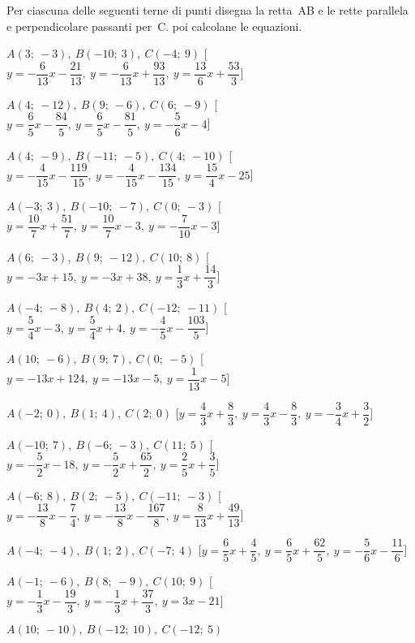 \begin{esercizio}\label{ese:}
 Per ciascuna delle seguenti terne di 
punti disegna la retta~AB e le rette parallela e perpendicolare passanti 
per~C. poi calcolane le equazioni.
 \begin{enumeratea}
  \item  $A(3;~-3),~B(-10;~3),~C(-4;~9)$ \hfill 
   [$y = -\dfrac{6}{13} x -\dfrac{21}{13},~y = -\dfrac{6}{13} x 
+\dfrac{93}{13},~y = \dfrac{13}{6} x +\dfrac{53}{3}$]
  \item  $A(4;~-12),~B(9;~-6),~C(6;~-9)$ \hfill 
   [$y = \dfrac{6}{5} x -\dfrac{84}{5},~y = \dfrac{6}{5} x -\dfrac{81}{5},~y = 
-\dfrac{5}{6} x -4$]
  \item  $A(4;~-9),~B(-11;~-5),~C(4;~-10)$ \hfill 
   [$y = -\dfrac{4}{15} x -\dfrac{119}{15},~y = -\dfrac{4}{15} x 
-\dfrac{134}{15},~y = \dfrac{15}{4} x -25$]
  \item  $A(-3;~3),~B(-10;~-7),~C(0;~-3)$ \hfill 
   [$y = \dfrac{10}{7} x +\dfrac{51}{7},~y = \dfrac{10}{7} x -3,~y = 
-\dfrac{7}{10} x -3$]
  \item  $A(6;~-3),~B(9;~-12),~C(10;~8)$ \hfill 
   [$y = -3 x +15,~y = -3 x +38,~y = \dfrac{1}{3} x +\dfrac{14}{3}$]
  \item  $A(-4;~-8),~B(4;~2),~C(-12;~-11)$ \hfill 
   [$y = \dfrac{5}{4} x -3,~y = \dfrac{5}{4} x +4,~y = -\dfrac{4}{5} x 
-\dfrac{103}{5}$]
  \item  $A(10;~-6),~B(9;~7),~C(0;~-5)$ \hfill 
   [$y = -13 x +124,~y = -13 x -5,~y = \dfrac{1}{13} x -5$]
  \item  $A(-2;~0),~B(1;~4),~C(2;~0)$ \hfill 
   [$y = \dfrac{4}{3} x +\dfrac{8}{3},~y = \dfrac{4}{3} x -\dfrac{8}{3},~y = 
-\dfrac{3}{4} x +\dfrac{3}{2}$]
  \item  $A(-10;~7),~B(-6;~-3),~C(11;~5)$ \hfill 
   [$y = -\dfrac{5}{2} x -18,~y = -\dfrac{5}{2} x +\dfrac{65}{2},~y = 
\dfrac{2}{5} x +\dfrac{3}{5}$]
  \item  $A(-6;~8),~B(2;~-5),~C(-11;~-3)$ \hfill 
   [$y = -\dfrac{13}{8} x -\dfrac{7}{4},~y = -\dfrac{13}{8} x -\dfrac{167}{8},~y 
= \dfrac{8}{13} x +\dfrac{49}{13}$]
  \item  $A(-4;~-4),~B(1;~2),~C(-7;~4)$ \hfill 
   [$y = \dfrac{6}{5} x +\dfrac{4}{5},~y = \dfrac{6}{5} x +\dfrac{62}{5},~y = 
-\dfrac{5}{6} x -\dfrac{11}{6}$]
  \item  $A(-1;~-6),~B(8;~-9),~C(10;~9)$ \hfill 
   [$y = -\dfrac{1}{3} x -\dfrac{19}{3},~y = -\dfrac{1}{3} x +\dfrac{37}{3},~y = 
3 x -21$]
  \item  $A(10;~-10),~B(-12;~10),~C(-12;~5)$ \hfill 

\end{enumeratea}
\end{esercizio}
